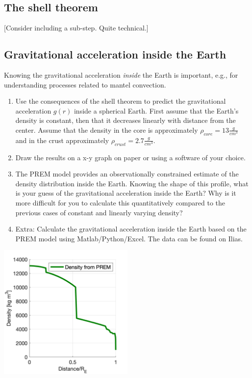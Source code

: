 \documentclass[a4paper,12pt]{article}
\begin{document}
\subsection{The shell theorem}
\label{Sec:Shell{}}
[Consider including a sub-step. Quite technical.]
\pagebreak
\subsection{Gravitational acceleration inside the Earth}
Knowing the gravitational acceleration \textit{inside} the Earth is important, e.g., for understanding processes related to mantel convection.
\begin{enumerate}[label=(\alph*)]
  \item Use the consequences of the shell theorem to predict the gravitational acceleration $g(r)$ inside a spherical Earth. First assume that the Earth's density is constant, then that it decreases linearly with distance from the center. Assume that the density in the core is approximately $\rho_{core} = 13 \frac{g}{cm^3}$ and in the crust approximately $\rho_{crust} = 2.7 \frac{g}{cm^3}$.

  \item Draw the results on a x-y graph on paper or using a software of your choice.

  \item The PREM model provides an observationally constrained estimate of the density distribution inside the Earth. Knowing the shape of this profile, what is your guess of the gravitational acceleration inside the Earth? Why is it more difficult for you to calculate this quantitatively compared to the previous cases of constant and linearly varying density?

  \item Extra: Calculate the gravitational acceleration inside the Earth based on the PREM model using Matlab/Python/Excel. The data can be found on Ilias.
\end{enumerate}
\begin{center}
    \includegraphics[width=0.5\textwidth]{Figures/Gravimetry/Gravimetry01_PREM.png}
 \end{center}
\end{document}
